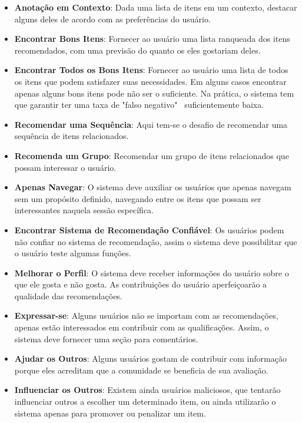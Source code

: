 \begin{itemize}
	\item{\textbf{Anotação em Contexto}: Dada uma lista de itens em um contexto, destacar alguns deles de acordo com as preferências do usuário.}
		
	\item{\textbf{Encontrar Bons Itens}: Fornecer ao usuário uma lista ranqueada dos itens recomendados, com uma previsão do quanto os eles gostariam deles.}
	
	\item{\textbf{Encontrar Todos os Bons Itens}: Fornecer ao usuário uma lista de todos os itens que podem satisfazer suas necessidades. Em alguns casos encontrar apenas alguns bons itens pode não ser o suficiente. Na prática, o sistema tem que garantir ter uma taxa de "falso negativo"~ suficientemente baixa.}
	
	\item{\textbf{Recomendar uma Sequência}: Aqui tem-se o desafio de recomendar uma sequência de itens relacionados.}
	
	\item{\textbf{Recomenda um Grupo}: Recomendar um grupo de itens relacionados que possam interessar o usuário.}
	
	\item{\textbf{Apenas Navegar}: O sistema deve auxiliar os usuários que apenas navegam sem um propósito definido, navegando entre os itens que possam ser interessantes naquela sessão específica.}
	
	\item{\textbf{Encontrar Sistema de Recomendação Confiável}: Os usuários podem não confiar no sistema de recomendação, assim o sistema deve possibilitar que o usuário teste algumas funções.}
	
	\item{\textbf{Melhorar o Perfil}: O sistema deve receber informações do usuário sobre o que ele gosta e não gosta. As contribuições do usuário aperfeiçoarão a qualidade das recomendações.}
	
	\item{\textbf{Expressar-se}: Alguns usuários não se importam com as recomendações, apenas estão interessados em contribuir com as qualificações. Assim, o sistema deve fornecer uma seção para comentários.}
	
	\item{\textbf{Ajudar os Outros}: Alguns usuários gostam de contribuir com informação porque eles acreditam que a comunidade se beneficia de sua avaliação.}
	
	\item{\textbf{Influenciar os Outros}: Existem ainda usuários maliciosos, que tentarão influenciar outros a escolher um determinado item, ou ainda utilizarão o sistema apenas para promover ou penalizar um item.}
\end{itemize}


